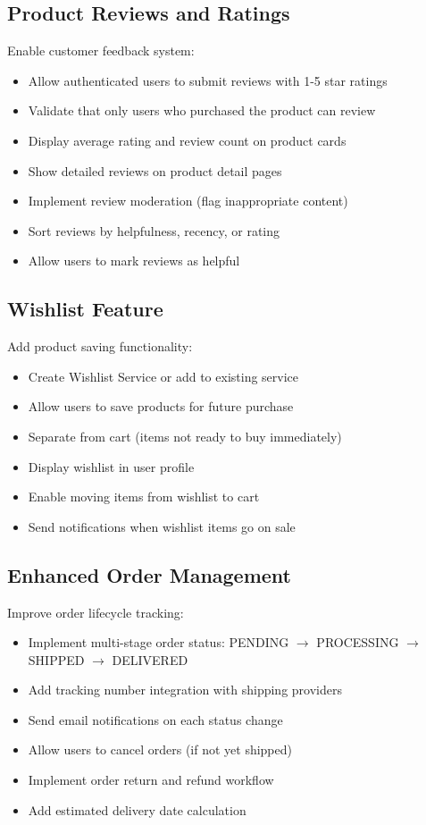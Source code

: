 \subsection{Product Reviews and Ratings}

Enable customer feedback system:
\begin{itemize}
    \item Allow authenticated users to submit reviews with 1-5 star ratings
    \item Validate that only users who purchased the product can review
    \item Display average rating and review count on product cards
    \item Show detailed reviews on product detail pages
    \item Implement review moderation (flag inappropriate content)
    \item Sort reviews by helpfulness, recency, or rating
    \item Allow users to mark reviews as helpful
\end{itemize}

\subsection{Wishlist Feature}

Add product saving functionality:
\begin{itemize}
    \item Create Wishlist Service or add to existing service
    \item Allow users to save products for future purchase
    \item Separate from cart (items not ready to buy immediately)
    \item Display wishlist in user profile
    \item Enable moving items from wishlist to cart
    \item Send notifications when wishlist items go on sale
\end{itemize}

\subsection{Enhanced Order Management}

Improve order lifecycle tracking:
\begin{itemize}
    \item Implement multi-stage order status: PENDING $\rightarrow$ PROCESSING $\rightarrow$ SHIPPED $\rightarrow$ DELIVERED
    \item Add tracking number integration with shipping providers
    \item Send email notifications on each status change
    \item Allow users to cancel orders (if not yet shipped)
    \item Implement order return and refund workflow
    \item Add estimated delivery date calculation
\end{itemize}

